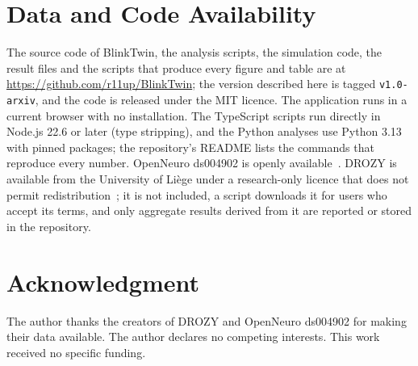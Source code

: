 \section*{Data and Code Availability}
\label{sec:statements}
The source code of BlinkTwin, the analysis scripts, the simulation code, the result files and the scripts that produce every figure and table are at \url{https://github.com/r11up/BlinkTwin}; the version described here is tagged \texttt{v1.0-arxiv}, and the code is released under the MIT licence. The application runs in a current browser with no installation. The TypeScript scripts run directly in Node.js 22.6 or later (type stripping), and the Python analyses use Python 3.13 with pinned packages; the repository's README lists the commands that reproduce every number. OpenNeuro ds004902 is openly available~\cite{xiang2024ds004902}. DROZY is available from the University of Li\`ege under a research-only licence that does not permit redistribution~\cite{massoz2016ulg}; it is not included, a script downloads it for users who accept its terms, and only aggregate results derived from it are reported or stored in the repository.

\section*{Acknowledgment}
The author thanks the creators of DROZY and OpenNeuro ds004902 for making their data available. The author declares no competing interests. This work received no specific funding.
